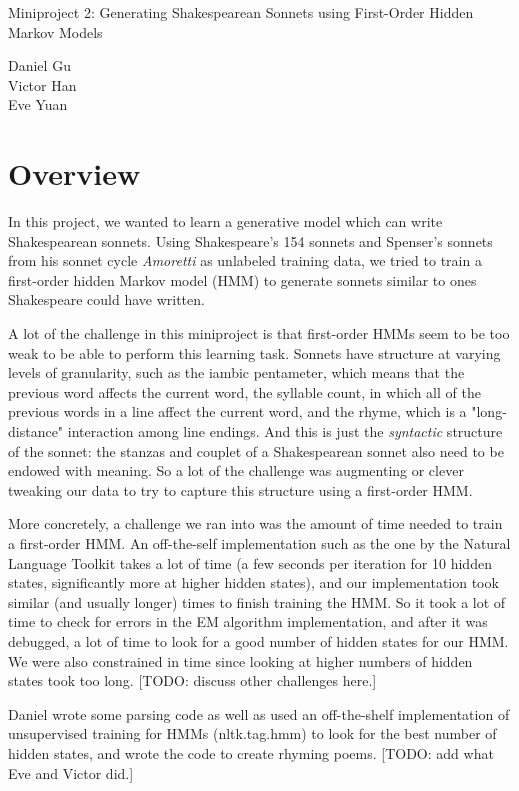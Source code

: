 



\pagestyle{fancy}

\LARGE
\begin{center}
Miniproject 2: Generating Shakespearean Sonnets using First-Order Hidden Markov Models

\large
Daniel Gu \\
Victor Han \\
Eve Yuan
\end{center}

\normalsize
\medskip

\section{Overview}
In this project, we wanted to learn a generative model which can write Shakespearean sonnets. Using Shakespeare's 154 sonnets and Spenser's sonnets from his sonnet cycle \textit{Amoretti} as unlabeled training data, we tried to train a first-order hidden Markov model (HMM) to generate sonnets similar to ones Shakespeare could have written.
\par A lot of the challenge in this miniproject is that first-order HMMs seem to be too weak to be able to perform this learning task. Sonnets have structure at varying levels of granularity, such as the iambic pentameter, which means that the previous word affects the current word, the syllable count, in which all of the previous words in a line affect the current word, and the rhyme, which is a "long-distance" interaction among line endings. And this is just the \textit{syntactic} structure of the sonnet: the stanzas and couplet of a Shakespearean sonnet also need to be endowed with meaning. So a lot of the challenge was augmenting or clever tweaking our data to try to capture this structure using a first-order HMM.
\par More concretely, a challenge we ran into was the amount of time needed to train a first-order HMM. An off-the-self implementation such as the one by the Natural Language Toolkit takes a lot of time (a few seconds per iteration for 10 hidden states, significantly more at higher hidden states), and our implementation took similar (and usually longer) times to finish training the HMM. So it took a lot of time to check for errors in the EM algorithm implementation, and after it was debugged, a lot of time to look for a good number of hidden states for our HMM. We were also constrained in time since looking at higher numbers of hidden states took too long. [TODO: discuss other challenges here.]
\par Daniel wrote some parsing code as well as used an off-the-shelf implementation of unsupervised training for HMMs (nltk.tag.hmm) to look for the best number of hidden states, and wrote the code to create rhyming poems. [TODO: add what Eve and Victor did.]


